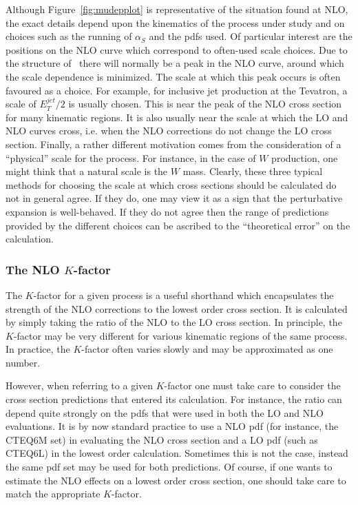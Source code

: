 \documentclass[12pt]{iopart}
\def\as{\alpha_S}
\begin{document}
Although Figure~\ref{fig:mudepplot} is representative of the situation found at NLO, the exact details depend upon
the kinematics of the process under study and on choices such as the running of $\as$ and the pdfs used. Of
particular interest are the positions on the NLO curve which correspond to often-used scale choices. Due to the
structure of~ there will normally be a peak in the NLO curve, around which the scale
dependence is minimized. The scale at which this peak occurs is often favoured as a choice. For example, for
inclusive jet production at the Tevatron, a scale of $E_T^{jet}/2$ is usually chosen. This is near the peak of the
NLO cross section for many kinematic regions. It is also usually near the scale at which the LO and NLO curves
cross, i.e. when the NLO corrections do not change the LO cross section.
Finally, a rather different motivation comes from the consideration of a ``physical'' scale for the process. For
instance, in the case of $W$ production, one might think that a natural scale is the $W$ mass. Clearly, these three
typical methods for choosing the scale at which cross sections should be calculated do not in general agree. If
they do, one may view it as a sign that the perturbative expansion is well-behaved. If they do not agree then the
range of predictions provided by the different choices can be ascribed to the ``theoretical error'' on the
calculation.

\subsubsection{The NLO $K$-factor}
\label{sec:kfac}

The $K$-factor for a given process is a useful shorthand which encapsulates the strength of the
NLO corrections to the lowest order cross section. It is calculated by simply taking the ratio of
the NLO to the LO cross section. In principle, the $K$-factor may be very different for various
kinematic regions of the same process. In practice, the $K$-factor often varies slowly and may be
approximated as one number. 

However, when referring to a given $K$-factor one must take care to consider
the cross section predictions that entered its calculation. For instance,
the ratio can depend quite strongly on the pdfs that were used in both the LO
and NLO evaluations. It is by now standard practice to use a NLO pdf (for instance,
the CTEQ6M set) in evaluating the NLO cross section and a LO pdf (such as CTEQ6L)
in the lowest order calculation. Sometimes this is not the case, instead the same
pdf set may be used for both predictions. Of course, if one wants to estimate
the NLO effects on a lowest order cross section, one should take care to match
the appropriate $K$-factor.
\end{document}
